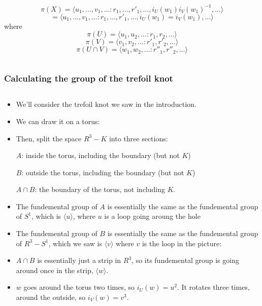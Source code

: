 \documentclass[8pt]{beamer}
\begin{document}
\begin{frame}
\begin{columns}
\begin{column}[T]{0.5\textwidth}
\begin{itemize}
          \[\pi(X) = \langle u_1, ..., v_1, ... : r_1, ...,
            r'_1, ..., i_U(w_1)i_V(w_1)^{-1}, ...\rangle \]
        \[= \langle u_1, ..., v_1, ... : r_1, ...,
            r'_1, ..., i_U(w_1)=i_V(w_1), ...\rangle \]
          where
            \[\pi(U) = \langle u_1, u_2, ...: r_1, r_2, ...\rangle \]
            \[\pi(V) = \langle v_1, v_2, ...: r'_1, r'_2, ...\rangle \]
            \[\pi(U \cap V) = \langle w_1, w_2, ... :r''_1, r''_2, ...\rangle\]
        \end{itemize}
      \end{column}
    \end{columns}
  \end{frame}
            
  \begin{frame}
    \frametitle{Calculating the group of the trefoil knot}
    \begin{columns}
      \begin{column}[T]{0.5\textwidth}
        \begin{itemize}
          \item<1-> We'll consider the trefoil knot we saw in the introduction.
          \item<2-> We can draw it on a torus:
          \item<3-> Then, split the space $R^3 - K$ into three sections:
          
            $A$: inside the torus, including the boundary (but not $K$)

            $B$: outside the torus, including the boundary (but not $K$)

            $A \cap B$: the boundary of the torus, not including $K$.

          \item<4-> The fundemental group of $A$ is essentially the same as the fundemental
          group of $S^1$, which is $\langle u\rangle $, where $u$ is a loop going aroung the hole

          \item<5-> The fundemental group of $B$ is essentially the same as the fundemental group
            of $R^3 - S^1$, which we saw is $\langle v\rangle $ where $v$ is the loop in the picture:

          \item<6-> $A \cap B$ is essentially just a strip in $R^3$, so its
            fundemental group is going around once in the strip, $\langle w\rangle $.

          \item<7-> $w$ goes around the torus two times, so $i_U(w) = u^2$. It rotates three times,
            around the outside, so $i_V(w) = v^3$.


\end{itemize}
\end{column}
\end{columns}
\end{frame}
\end{document}
